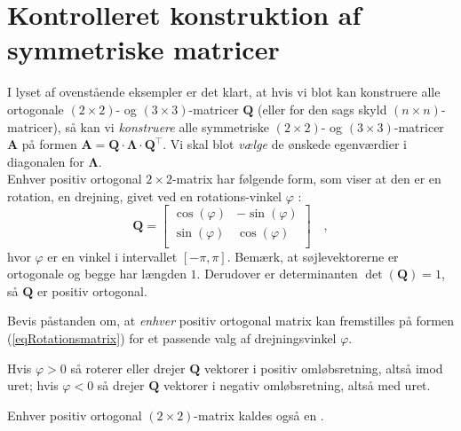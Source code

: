 
\section{Kontrolleret konstruktion af symmetriske matricer}
I lyset af ovenstående eksempler er det klart, at hvis vi blot kan konstruere alle ortogonale $(2 \times 2)$- og $(3 \times 3)$-matricer $\mathbf{Q}$ (eller for den sags skyld $(n \times n)$-matricer), så kan vi {\emph{konstruere}} alle symmetriske $(2 \times 2)$- og $(3 \times 3)$-matricer $\mathbf{A}$ på formen $\mathbf{A} = \mathbf{Q}\cdot \bm{\Lambda}\cdot \mathbf{Q}^{\top}$. Vi skal blot {\emph{vælge}} de ønskede egenværdier i diagonalen for $\bm{\Lambda}$.\\

 Enhver positiv ortogonal  $2 \times 2$-matrix har følgende form, som viser at den er en rotation, en drejning, givet ved en rotations-vinkel $\varphi\,\,$:
\begin{equation} \label{eqRotationsmatrix}
\mathbf{Q} = \left[
                \begin{array}{cc}
                  \cos(\varphi) & -\sin(\varphi) \\
                  \sin(\varphi) & \cos(\varphi)  \\
                \end{array}
              \right] \quad ,
\end{equation}
hvor $\varphi$ er en vinkel i intervallet $[-\pi, \pi]$. Bemærk, at søjlevektorerne er ortogonale og begge har længden $1$. Derudover er determinanten $\det(\mathbf{Q}) = 1$, så $\mathbf{Q}$ er positiv ortogonal.

\begin{exercise} \label{exercOrtog2Ddrejn}
Bevis påstanden om, at {\emph{enhver}} positiv ortogonal matrix kan fremstilles på formen (\ref{eqRotationsmatrix}) for et passende valg af drejningsvinkel $\varphi$.
\end{exercise}

Hvis  $\varphi > 0$ så roterer eller drejer $\mathbf{Q}$ vektorer i positiv omløbsretning, altså imod uret;  hvis $\varphi < 0$ så drejer $\mathbf{Q}$ vektorer i negativ omløbsretning, altså med uret. \\

\begin{definition} \label{defDrejmat}
Enhver positiv ortogonal $(2 \times 2)$-matrix kaldes også en .
\end{definition}


